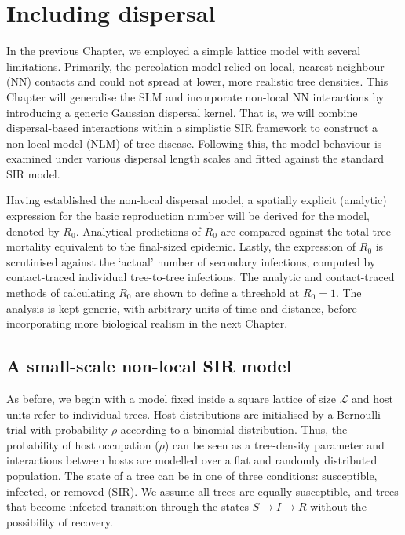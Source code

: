 \chapter{Including dispersal}

\label{ch5:dispersal-model}
In the previous Chapter, we employed a simple lattice model with several limitations. 
Primarily, the percolation model relied on local, nearest-neighbour (NN) contacts and could not spread at lower, more realistic tree densities. 
This Chapter will generalise the SLM and incorporate non-local NN interactions by introducing a generic Gaussian dispersal kernel.
That is, we will combine dispersal-based interactions within a simplistic SIR framework to construct a non-local model (NLM) of tree disease.
Following this, the model behaviour is examined under various dispersal length scales and fitted against the standard SIR model.

Having established the non-local dispersal model, a spatially explicit (analytic) expression for the basic reproduction number will be derived for the model, denoted by $R_0$.
Analytical predictions of $R_0$ are compared against the total tree mortality equivalent to the final-sized epidemic.
Lastly, the expression of $R_0$ is scrutinised against the `actual' number of secondary infections, computed by contact-traced individual tree-to-tree infections.
The analytic and contact-traced methods of calculating $R_0$ are shown to define a threshold at $R_0=1$.
The analysis is kept generic, with arbitrary units of time and distance, before incorporating more biological realism in the next Chapter. 

\section{A small-scale non-local SIR model}
\label{section:sgm-expo}

As before, we begin with a model fixed inside a square lattice of size $\mathcal{L}$ and host units refer to individual trees.
Host distributions are initialised by a Bernoulli trial with probability $\rho$ according to a binomial distribution.
Thus, the probability of host occupation ($\rho$) can be seen as a tree-density parameter and interactions between hosts are modelled over a flat and randomly distributed population.
The state of a tree can be in one of three conditions: susceptible, infected, or removed (SIR).
We assume all trees are equally susceptible, and trees that become infected transition through the states $S\rightarrow I\rightarrow R$ without the possibility of recovery.

